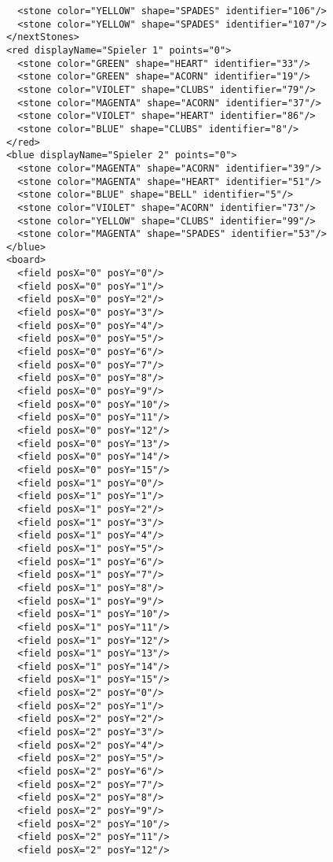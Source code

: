 \documentclass[12pt,a4paper, ngerman, oneside]{scrartcl}
\begin{document}
\begin{enumerate}
\begin{verbatim}
        <stone color="YELLOW" shape="SPADES" identifier="106"/>
        <stone color="YELLOW" shape="SPADES" identifier="107"/>
      </nextStones>
      <red displayName="Spieler 1" points="0">
        <stone color="GREEN" shape="HEART" identifier="33"/>
        <stone color="GREEN" shape="ACORN" identifier="19"/>
        <stone color="VIOLET" shape="CLUBS" identifier="79"/>
        <stone color="MAGENTA" shape="ACORN" identifier="37"/>
        <stone color="VIOLET" shape="HEART" identifier="86"/>
        <stone color="BLUE" shape="CLUBS" identifier="8"/>
      </red>
      <blue displayName="Spieler 2" points="0">
        <stone color="MAGENTA" shape="ACORN" identifier="39"/>
        <stone color="MAGENTA" shape="HEART" identifier="51"/>
        <stone color="BLUE" shape="BELL" identifier="5"/>
        <stone color="VIOLET" shape="ACORN" identifier="73"/>
        <stone color="YELLOW" shape="CLUBS" identifier="99"/>
        <stone color="MAGENTA" shape="SPADES" identifier="53"/>
      </blue>
      <board>
        <field posX="0" posY="0"/>
        <field posX="0" posY="1"/>
        <field posX="0" posY="2"/>
        <field posX="0" posY="3"/>
        <field posX="0" posY="4"/>
        <field posX="0" posY="5"/>
        <field posX="0" posY="6"/>
        <field posX="0" posY="7"/>
        <field posX="0" posY="8"/>
        <field posX="0" posY="9"/>
        <field posX="0" posY="10"/>
        <field posX="0" posY="11"/>
        <field posX="0" posY="12"/>
        <field posX="0" posY="13"/>
        <field posX="0" posY="14"/>
        <field posX="0" posY="15"/>
        <field posX="1" posY="0"/>
        <field posX="1" posY="1"/>
        <field posX="1" posY="2"/>
        <field posX="1" posY="3"/>
        <field posX="1" posY="4"/>
        <field posX="1" posY="5"/>
        <field posX="1" posY="6"/>
        <field posX="1" posY="7"/>
        <field posX="1" posY="8"/>
        <field posX="1" posY="9"/>
        <field posX="1" posY="10"/>
        <field posX="1" posY="11"/>
        <field posX="1" posY="12"/>
        <field posX="1" posY="13"/>
        <field posX="1" posY="14"/>
        <field posX="1" posY="15"/>
        <field posX="2" posY="0"/>
        <field posX="2" posY="1"/>
        <field posX="2" posY="2"/>
        <field posX="2" posY="3"/>
        <field posX="2" posY="4"/>
        <field posX="2" posY="5"/>
        <field posX="2" posY="6"/>
        <field posX="2" posY="7"/>
        <field posX="2" posY="8"/>
        <field posX="2" posY="9"/>
        <field posX="2" posY="10"/>
        <field posX="2" posY="11"/>
        <field posX="2" posY="12"/>

\end{verbatim}
\end{enumerate}
\end{document}
